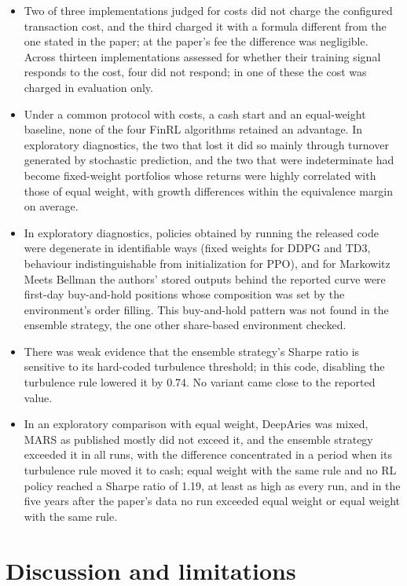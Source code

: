 \documentclass[12pt,a4paper]{report}
\providecommand{\tightlist}{\setlength{\itemsep}{0pt}\setlength{\parskip}{0pt}}
\newcounter{none} %
\begin{document}
\begin{itemize}
\tightlist
\item
  Two of three implementations judged for costs did not charge the
  configured transaction cost, and the third charged it with a formula
  different from the one stated in the paper; at the paper's fee the
  difference was negligible. Across thirteen implementations assessed
  for whether their training signal responds to the cost, four did not
  respond; in one of these the cost was charged in evaluation only.
\item
  Under a common protocol with costs, a cash start and an equal-weight
  baseline, none of the four FinRL algorithms retained an advantage. In
  exploratory diagnostics, the two that lost it did so mainly through
  turnover generated by stochastic prediction, and the two that were
  indeterminate had become fixed-weight portfolios whose returns were
  highly correlated with those of equal weight, with growth differences
  within the equivalence margin on average.
\item
  In exploratory diagnostics, policies obtained by running the released
  code were degenerate in identifiable ways (fixed weights for DDPG and
  TD3, behaviour indistinguishable from initialization for PPO), and for
  Markowitz Meets Bellman the authors' stored outputs behind the
  reported curve were first-day buy-and-hold positions whose composition
  was set by the environment's order filling. This buy-and-hold pattern
  was not found in the ensemble strategy, the one other share-based
  environment checked.
\item
  There was weak evidence that the ensemble strategy's Sharpe ratio is
  sensitive to its hard-coded turbulence threshold; in this code,
  disabling the turbulence rule lowered it by 0.74. No variant came
  close to the reported value.
\item
  In an exploratory comparison with equal weight, DeepAries was mixed,
  MARS as published mostly did not exceed it, and the ensemble strategy
  exceeded it in all runs, with the difference concentrated in a period
  when its turbulence rule moved it to cash; equal weight with the same
  rule and no RL policy reached a Sharpe ratio of 1.19, at least as high
  as every run, and in the five years after the paper's data no run
  exceeded equal weight or equal weight with the same rule.
\end{itemize}

\chapter{Discussion and
limitations}\label{chapter-8.-discussion-and-limitations}
\end{document}
